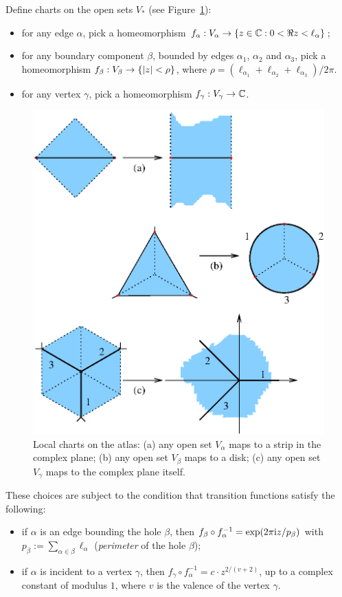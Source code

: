 Define charts on the open sets $V_*$ (see Figure~\ref{fig:charts}):
\begin{itemize}
\item for any edge $\alpha$, pick a homeomorphism $f_\alpha: V_\alpha \to \{ z \in \mathbb{C}
  : 0 < \Re z < \ell_\alpha \}$;
\item for any boundary component $\beta$, bounded by edges $\alpha_1$, $\alpha_2$
  and $\alpha_3$, pick a homeomorphism $f_\beta: V_\beta \to \{ \lvert z\rvert < \rho \}$, where
  $\rho = (\ell_{\alpha_1} + \ell_{\alpha_2} + \ell_{\alpha_3}) / 2\pi$.
\item for any vertex $\gamma$, pick a homeomorphism $f_\gamma: V_\gamma \to \mathbb{C}$.
\end{itemize}
\begin{figure}[htbp]
  \centering\includegraphics{charts}
  \caption{Local charts on the atlas: (a) any open set $V_\alpha$
    maps to a strip in the complex plane; (b) any open set $V_\beta$
    maps to a disk; (c) any open set $V_\gamma$ maps to the complex
    plane itself.}
  \label{fig:charts}
\end{figure}
These choices are subject to the condition that transition functions
satisfy the following:
\begin{itemize}
\item if $\alpha$ is an edge bounding the hole $\beta$, then $f_\beta \circ
  f_\alpha^{-1} = \exp (2\pi\mathrm{i} z / p_\beta)$ with $p_\beta := \sum_{\alpha \in \beta} \ell_\alpha$
  (\emph{perimeter} of the hole $\beta$);
\item if $\alpha$ is incident to a vertex $\gamma$, then $f_\gamma \circ f_\alpha^{-1} =
  c \cdot z^{2/(v+2)}$, up to a complex constant of modulus $1$, where
  $v$ is the valence of the vertex $\gamma$.
\end{itemize}

